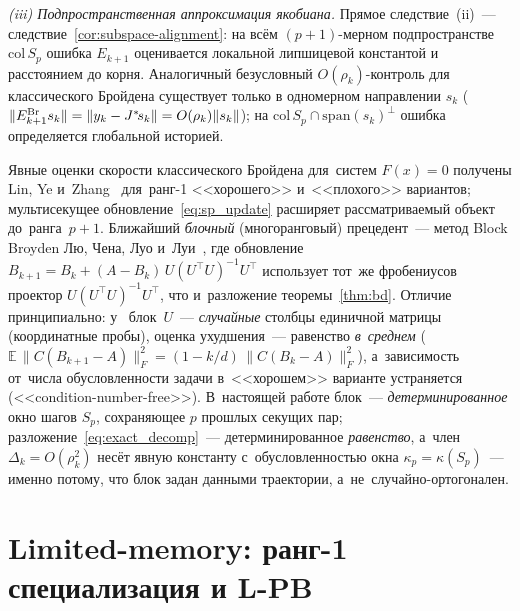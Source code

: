 \begin{remark}
\smallskip
\noindent\textit{(iii) Подпространственная аппроксимация якобиана.}
Прямое следствие~(ii)~--- следствие~\ref{cor:subspace-alignment}: на
всём $(p{+}1)$-мерном подпространстве $\mathrm{col}\,S_p$ ошибка $E_{k+1}$
оценивается локальной липшицевой константой и расстоянием до корня.
Аналогичный безусловный $O(\rho_k)$-контроль для классического Бройдена
существует только в одномерном направлении $s_k$
($\|E_{k+1}^{\mathrm{Br}} s_k\| = \|y_k - J^{*}\!s_k\| = O(\rho_k)\|s_k\|$);
на $\mathrm{col}\,S_p\cap\mathrm{span}(s_k)^\perp$ ошибка определяется
глобальной историей.
\end{remark}

\begin{remark}\label{rem:block_broyden}
Явные оценки скорости классического Бройдена для~систем $F(x)=0$ получены
Lin, Ye и~Zhang~\cite{lin2021broyden} для~ранг-1 <<хорошего>>
и~<<плохого>> вариантов; мультисекущее обновление~\eqref{eq:sp_update}
расширяет рассматриваемый объект до~ранга~$p{+}1$. Ближайший
\emph{блочный} (многоранговый) прецедент~--- метод Block Broyden Лю,
Чена, Луо и~Луи~\cite{liu2023block}, где обновление
$B_{k+1}=B_k+(A-B_k)\,U(U^\top U)^{-1}U^\top$ использует тот~же
фробениусов проектор $U(U^\top U)^{-1}U^\top$, что и~разложение
теоремы~\ref{thm:bd}. Отличие принципиально: у~\cite{liu2023block}
блок~$U$~--- \emph{случайные} столбцы единичной матрицы (координатные
пробы), оценка ухудшения~--- равенство \emph{в~среднем}
($\mathbb{E}\,\|C(B_{k+1}-A)\|_F^2=(1-k/d)\,\|C(B_k-A)\|_F^2$),
а~зависимость от~числа обусловленности задачи в~<<хорошем>> варианте
устраняется (<<condition-number-free>>). В~настоящей работе
блок~--- \emph{детерминированное} окно шагов $S_p$, сохраняющее
$p$ прошлых секущих пар; разложение~\eqref{eq:exact_decomp}~---
детерминированное \emph{равенство}, а~член $\Delta_k=O(\rho_k^2)$ несёт
явную константу с~обусловленностью окна $\kappa_p=\kappa(S_p)$~--- именно
потому, что блок задан данными траектории, а~не~случайно-ортогонален.
\end{remark}



\section{Limited-memory: ранг-1 специализация и L-PB}\label{sec:highdim}

